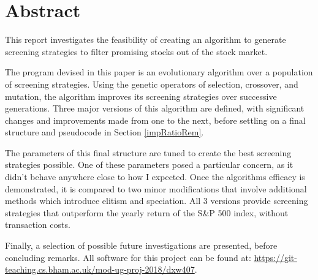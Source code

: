 \section{Abstract}
This report investigates the feasibility of creating an algorithm to generate screening strategies to filter promising stocks out of the stock market. \newline

The program devised in this paper is an evolutionary algorithm over a population of screening strategies. Using the genetic operators of selection, crossover, and mutation, the algorithm improves its screening strategies over successive generations. Three major versions of this algorithm are defined, with significant changes and improvements made from one to the next, before settling on a final structure and pseudocode in Section \ref{impRatioRem}. \newline

The parameters of this final structure are tuned to create the best screening strategies possible. One of these parameters posed a particular concern, as it didn't behave anywhere close to how I expected. Once the algorithms efficacy is demonstrated, it is compared to two minor modifications that involve additional methods which introduce elitism and speciation. All 3 versions provide screening strategies that outperform the yearly return of the S\&P 500 index, without transaction costs. \newline 

Finally, a selection of possible future investigations are presented, before concluding remarks. All software for this project can be found at: \newline \url{https://git-teaching.cs.bham.ac.uk/mod-ug-proj-2018/dxw407}.
